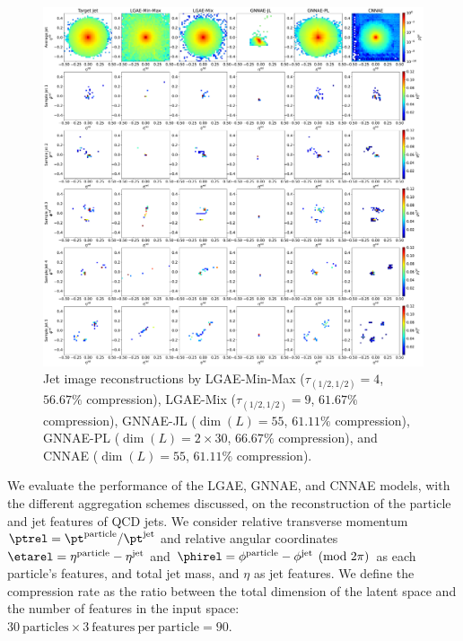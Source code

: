 \begin{figure}[ht!]
    \centering
    \includegraphics[width=\linewidth]{figures/06-ML4Jets/lgae/reconstructions/jet_images-cnnae.pdf}
    \caption[Jet image reconstructions.]{Jet image reconstructions by
        LGAE-Min-Max ($\tau_{(1/2, 1/2)}=4$, $56.67\%$ compression),
        LGAE-Mix ($\tau_{(1/2, 1/2)}=9$, $61.67\%$ compression),
        GNNAE-JL ($\dim(L) = 55$, $61.11\%$ compression),
        GNNAE-PL ($\dim(L) = 2\times 30$, $66.67\%$ compression), and CNNAE ($\dim(L) = 55$, $61.11\%$ compression).
    }
    \label{fig:06_lgae_recons-jet-imgs}
\end{figure}


We evaluate the performance of the LGAE, GNNAE, and CNNAE models, with the different aggregation schemes discussed, on the reconstruction of the particle and jet features of QCD jets.
We consider relative transverse momentum
$\ptrel = \pt^{\mathrm{particle}}/\pt^{\mathrm{jet}}$ and relative angular coordinates
$\etarel =\eta^{\mathrm{particle}} - \eta^{\mathrm{jet}}$ and
$\phirel =\phi^{\mathrm{particle}} - \phi^{\mathrm{jet}} \pmod{2\pi}$
as each particle's features, and total jet mass, \pt and $\eta$ as jet features.
We define the compression rate as the ratio between the total dimension of the latent space and the number of features in the input space: $30\ \mathrm{particles} \times 3\ \mathrm{features\ per\ particle} = 90$.

